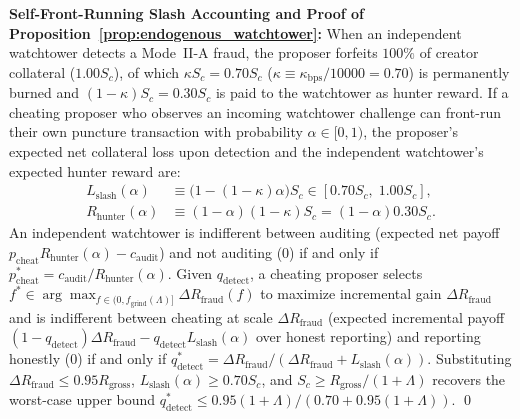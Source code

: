 \documentclass[runningheads,a4paper]{llncs}
\renewcommand{\_}{\textunderscore\allowbreak}
\begin{document}
\textbf{Self-Front-Running Slash Accounting and Proof of Proposition~\ref{prop:endogenous_watchtower}:} When an independent watchtower detects a Mode~II-A fraud, the proposer forfeits $100\%$ of creator collateral ($1.00 S_c$), of which $\kappa S_c = 0.70 S_c$ ($\kappa \equiv \kappa_{\text{bps}}/10000 = 0.70$) is permanently burned and $(1 - \kappa) S_c = 0.30 S_c$ is paid to the watchtower as hunter reward. If a cheating proposer who observes an incoming watchtower challenge can front-run their own puncture transaction with probability $\alpha \in [0,\allowbreak 1)$, the proposer's expected net collateral loss upon detection and the independent watchtower's expected hunter reward are:
\begin{equation}
\label{eq:slash_alpha_accounting}
\begin{aligned}
L_{\text{slash}}(\alpha) &\equiv \big(1 - (1 - \kappa)\alpha\big) S_c \in [0.70 S_c, \; 1.00 S_c], \\
R_{\text{hunter}}(\alpha) &\equiv (1 - \alpha)(1 - \kappa) S_c = (1 - \alpha) 0.30 S_c.
\end{aligned}
\end{equation}
An independent watchtower is indifferent between auditing (expected net payoff $p_{\text{cheat}} R_{\text{hunter}}(\alpha) - c_{\text{audit}}$) and not auditing ($0$) if and only if $p_{\text{cheat}}^* = c_{\text{audit}} / R_{\text{hunter}}(\alpha)$. Given $q_{\text{detect}}$, a cheating proposer selects $f^* \in \arg\max_{f \in (0,\allowbreak f_{\text{grind}}(\Lambda)]} \Delta R_{\text{fraud}}(f)$ to maximize incremental gain $\Delta R_{\text{fraud}}$ and is indifferent between cheating at scale $\Delta R_{\text{fraud}}$ (expected incremental payoff $(1 - q_{\text{detect}}) \Delta R_{\text{fraud}} - q_{\text{detect}} L_{\text{slash}}(\alpha)$ over honest reporting) and reporting honestly ($0$) if and only if $q_{\text{detect}}^* = \Delta R_{\text{fraud}} / (\Delta R_{\text{fraud}} + L_{\text{slash}}(\alpha))$. Substituting $\Delta R_{\text{fraud}} \le 0.95 R_{\text{gross}}$, $L_{\text{slash}}(\alpha) \ge 0.70 S_c$, and $S_c \ge R_{\text{gross}} / (1 + \Lambda)$ recovers the worst-case upper bound $q_{\text{detect}}^* \le 0.95(1+\Lambda)/(0.70 + 0.95(1+\Lambda))$. \qed
\end{document}
